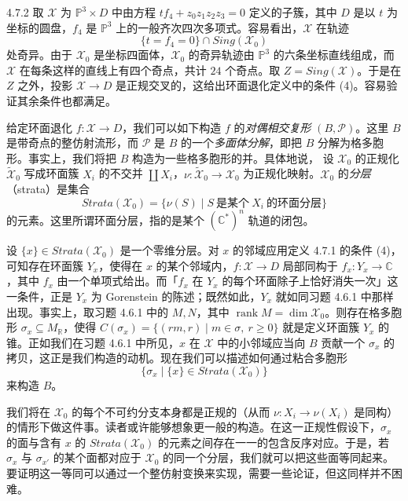 \begin{example}{4.7.2}
取 $\mathcal{X}$ 为 $\mathbb{P}^3\times D$ 中由方程 $tf_4+z_0z_1z_2z_3=0$ 定义的子簇，其中 $D$ 是以 $t$ 为坐标的圆盘，$f_4$ 是 $\mathbb{P}^3$ 上的一般齐次四次多项式。容易看出，$\mathcal{X}$ 在轨迹
\[
\{t=f_4=0\}\cap\mathit{Sing}(\mathcal{X}_0)
\]
处奇异。由于 $\mathcal{X}_0$ 是坐标四面体，$\mathcal{X}_0$ 的奇异轨迹由 $\mathbb{P}^3$ 的六条坐标直线组成，而 $\mathcal{X}$ 在每条这样的直线上有四个奇点，共计 $24$ 个奇点。取 $Z=\mathit{Sing}(\mathcal{X})$。于是在 $Z$ 之外，投影 $\mathcal{X}\to D$ 是正规交叉的，这给出环面退化定义中的条件 (4)。容易验证其余条件也都满足。
\end{example}

给定环面退化 $f:\mathcal{X}\to D$，我们可以如下构造 $f$ 的\emph{对偶相交复形} $(B,\mathcal{P})$。这里 $B$ 是带奇点的整仿射流形，而 $\mathcal{P}$ 是 $B$ 的一个\emph{多面体分解}，即把 $B$ 分解为格多胞形。事实上，我们将把 $B$ 构造为一些格多胞形的并。具体地说，
设 $\mathcal{X}_0$ 的正规化 $\widetilde{\mathcal{X}}_0$ 写成环面簇 $X_i$ 的不交并 $\coprod X_i$，$\nu:\widetilde{\mathcal{X}}_0\to\mathcal{X}_0$ 为正规化映射。$\mathcal{X}_0$ 的\emph{分层}（strata）是集合
\[
\mathit{Strata}(\mathcal{X}_0)=\{\nu(S)\mid S\ \text{是某个}\ X_i\ \text{的环面分层}\}
\]
的元素。这里所谓环面分层，指的是某个 $(\mathbb{C}^*)^n$ 轨道的闭包。

设 $\{x\}\in\mathit{Strata}(\mathcal{X}_0)$ 是一个零维分层。对 $x$ 的邻域应用定义 4.7.1 的条件 (4)，可知存在环面簇 $Y_x$，使得在 $x$ 的某个邻域内，$f:\mathcal{X}\to D$ 局部同构于 $f_x:Y_x\to\mathbb{C}$，其中 $f_x$ 由一个单项式给出。而「$f_x$ 在 $Y_x$ 的每个环面除子上恰好消失一次」这一条件，正是 $Y_x$ 为 Gorenstein 的陈述；既然如此，$Y_x$ 就如同习题 4.6.1 中那样出现。事实上，取习题 4.6.1 中的 $M,N$，其中 $\operatorname{rank}M=\dim\mathcal{X}_0$。则存在格多胞形 $\sigma_x\subseteq M_{\mathbb{R}}$，使得 $C(\sigma_x)=\{(rm,r)\mid m\in\sigma,\ r\ge 0\}$ 就是定义环面簇 $Y_x$ 的锥。正如我们在习题 4.6.1 中所见，$x$ 在 $\mathcal{X}$ 中的小邻域应当向 $B$ 贡献一个 $\sigma_x$ 的拷贝，这正是我们构造的动机。现在我们可以描述如何通过粘合多胞形
\[
\{\sigma_x\mid \{x\}\in\mathit{Strata}(\mathcal{X}_0)\}
\]
来构造 $B$。

我们将在 $\mathcal{X}_0$ 的每个不可约分支本身都是正规的（从而 $\nu:X_i\to\nu(X_i)$ 是同构）的情形下做这件事。读者或许能够想象更一般的构造。在这一正规性假设下，$\sigma_x$ 的面与含有 $x$ 的 $\mathit{Strata}(\mathcal{X}_0)$ 的元素之间存在一一的包含反序对应。于是，若 $\sigma_x$ 与 $\sigma_{x'}$ 的某个面都对应于 $\mathcal{X}_0$ 的同一个分层，我们就可以把这些面等同起来。要证明这一等同可以通过一个整仿射变换来实现，需要一些论证，但这同样并不困难。

